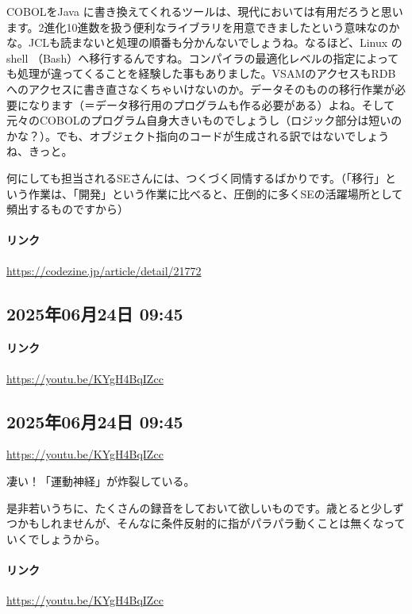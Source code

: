 COBOLをJava に書き換えてくれるツールは、現代においては有用だろうと思います。2進化10進数を扱う便利なライブラリを用意できましたという意味なのかな。JCLも読まないと処理の順番も分かんないでしょうね。なるほど、Linux のshell （Bash）へ移行するんですね。コンパイラの最適化レベルの指定によっても処理が違ってくることを経験した事もありました。VSAMのアクセスもRDBへのアクセスに書き直さなくちゃいけないのか。データそのものの移行作業が必要になります（＝データ移行用のプログラムも作る必要がある）よね。そして元々のCOBOLのプログラム自身大きいものでしょうし（ロジック部分は短いのかな？）。でも、オブジェクト指向のコードが生成される訳ではないでしょうね、きっと。

何にしても担当されるSEさんには、つくづく同情するばかりです。（「移行」という作業は、「開発」という作業に比べると、圧倒的に多くSEの活躍場所として頻出するものですから）

\paragraph{リンク}
\url{https://codezine.jp/article/detail/21772}

\subsection*{2025年06月24日 09:45}

\paragraph{リンク}
\url{https://youtu.be/KYgH4BqIZcc}

\subsection*{2025年06月24日 09:45}

\url{https://youtu.be/KYgH4BqIZcc}

凄い！「運動神経」が炸裂している。

是非若いうちに、たくさんの録音をしておいて欲しいものです。歳とると少しずつかもしれませんが、そんなに条件反射的に指がパラパラ動くことは無くなっていくでしょうから。

\paragraph{リンク}
\url{https://youtu.be/KYgH4BqIZcc}

